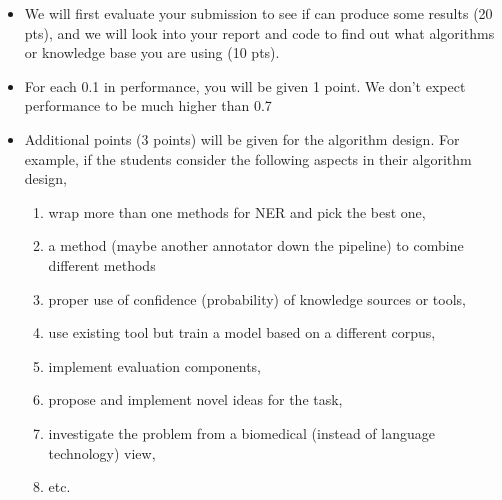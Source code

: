 \begin{itemize}

\item We will first evaluate your submission to see if can produce some
results (20 pts), and we will look into your report and code to find out what
algorithms or knowledge base you are using (10 pts).

\item For each 0.1 in performance, you will be given 1 point. We don't expect performance
to be much higher than 0.7

\item Additional points (3 points) will be given for the algorithm design.
For example, if the students consider the following aspects in their algorithm
design,

\begin{enumerate}
\item wrap more than one methods for NER and pick the best one,
\item a method (maybe another annotator down the pipeline) to combine different methods
\item proper use of confidence (probability) of knowledge sources or tools,
\item use existing tool but train a model based on a different corpus,
\item implement evaluation components,
\item propose and implement novel ideas for the task,
\item investigate the problem from a biomedical (instead of language technology) view,
\item etc.
\end{enumerate}


\end{itemize}
